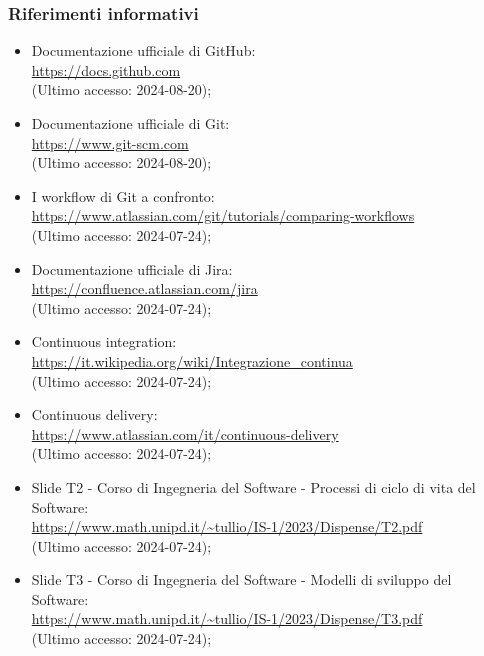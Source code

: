 \subsubsection{Riferimenti informativi}
\begin{itemize}
  \item Documentazione ufficiale di GitHub: \\ \href{https://docs.github.com}{https://docs.github.com}  \\ (Ultimo accesso: 2024-08-20);
  \item Documentazione ufficiale di Git: \\ \href{https://www.git-scm.com}{https://www.git-scm.com}  \\ (Ultimo accesso: 2024-08-20);
  \item I workflow di Git a confronto: \\ \href{https://www.atlassian.com/git/tutorials/comparing-workflows}{https://www.atlassian.com/git/tutorials/comparing-workflows}  \\ (Ultimo accesso: 2024-07-24);
  \item Documentazione ufficiale di Jira: \\ \href{https://confluence.atlassian.com/jira}{https://confluence.atlassian.com/jira}  \\ (Ultimo accesso: 2024-07-24);
  \item Continuous integration: \\ \href{https://it.wikipedia.org/wiki/Integrazionecontinua}{https://it.wikipedia.org/wiki/Integrazione\_continua}  \\ (Ultimo accesso: 2024-07-24);
  \item Continuous delivery: \\ \href{https://www.atlassian.com/it/continuous-delivery}{https://www.atlassian.com/it/continuous-delivery}  \\ (Ultimo accesso: 2024-07-24);
  \item Slide T2 - Corso di Ingegneria del Software - Processi di ciclo di vita del Software: \\ \href{https://www.math.unipd.it/~tullio/IS-1/2023/Dispense/T2.pdf}{https://www.math.unipd.it/\textasciitilde tullio/IS-1/2023/Dispense/T2.pdf}  \\ (Ultimo accesso: 2024-07-24);
  \item Slide T3 - Corso di Ingegneria del Software - Modelli di sviluppo del Software: \\ \href{https://www.math.unipd.it/~tullio/IS-1/2023/Dispense/T3.pdf}{https://www.math.unipd.it/\textasciitilde tullio/IS-1/2023/Dispense/T3.pdf}  \\ (Ultimo accesso: 2024-07-24);

\end{itemize}
